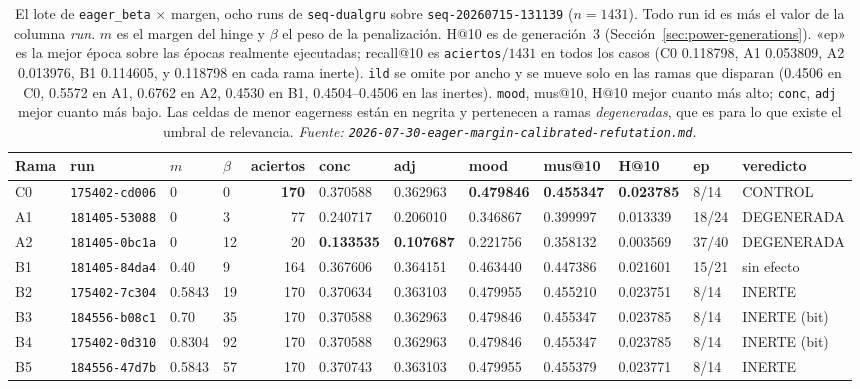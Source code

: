 \documentclass[11pt]{article}
\newcommand{\runid}[1]{\texttt{\small\seqsplit{#1}}}
\newcommand{\dsid}[1]{\texttt{\small #1}}
\newcommand{\best}[1]{\textbf{#1}}
\begin{document}
\begin{table}[ht]
  \centering
  \caption{El lote de \texttt{eager\_beta} $\times$ margen, ocho runs de
  \texttt{seq-dualgru} sobre \dsid{seq-20260715-131139} ($n=\num{1431}$). Todo run
  id es \protect\runid{run-20260730-} más el valor de la columna \emph{run}. $m$ es
  el margen del hinge y $\beta$ el peso de la penalización. H@10 es de
  generación~3 (Sección~\ref{sec:power-generations}). «ep» es la mejor época sobre
  las épocas realmente ejecutadas; recall@10 es \texttt{aciertos}$/\num{1431}$ en
  todos los casos (C0 \num{0.118798}, A1 \num{0.053809}, A2 \num{0.013976}, B1
  \num{0.114605}, y \num{0.118798} en cada rama inerte). \texttt{ild} se omite por
  ancho y se mueve solo en las ramas que disparan (\num{0.4506} en C0,
  \num{0.5572} en A1, \num{0.6762} en A2, \num{0.4530} en B1,
  \numrange{0.4504}{0.4506} en las inertes). \texttt{mood}, mus@10, H@10 mejor
  cuanto más alto; \texttt{conc}, \texttt{adj} mejor cuanto más bajo. Las celdas de
  menor eagerness están en negrita y pertenecen a ramas \emph{degeneradas}, que es
  para lo que existe el umbral de relevancia.
  \emph{Fuente: \texttt{2026-07-30-eager-margin-calibrated-refutation.md}.}}
  \label{tab:eagermargin}
  {\scriptsize\setlength{\tabcolsep}{2.5pt}\begin{tabular}{llllrlllllll}
    \toprule
    Rama & run & $m$ & $\beta$ & aciertos & conc & adj & mood & mus@10 & H@10 & ep & veredicto \\
    \midrule
    C0 & \texttt{175402-cd006} & 0 & 0 & \best{170} & 0.370588 & 0.362963 & \best{0.479846} & \best{0.455347} & \best{0.023785} & 8/14 & CONTROL \\
    A1 & \texttt{181405-53088} & 0 & 3 & 77 & 0.240717 & 0.206010 & 0.346867 & 0.399997 & 0.013339 & 18/24 & DEGENERADA \\
    A2 & \texttt{181405-0bc1a} & 0 & 12 & 20 & \best{0.133535} & \best{0.107687} & 0.221756 & 0.358132 & 0.003569 & 37/40 & DEGENERADA \\
    B1 & \texttt{181405-84da4} & 0.40 & 9 & 164 & 0.367606 & 0.364151 & 0.463440 & 0.447386 & 0.021601 & 15/21 & sin efecto \\
    B2 & \texttt{175402-7c304} & 0.5843 & 19 & 170 & 0.370634 & 0.363103 & 0.479955 & 0.455210 & 0.023751 & 8/14 & INERTE \\
    B3 & \texttt{184556-b08c1} & 0.70 & 35 & 170 & 0.370588 & 0.362963 & 0.479846 & 0.455347 & 0.023785 & 8/14 & INERTE (bit) \\
    B4 & \texttt{175402-0d310} & 0.8304 & 92 & 170 & 0.370588 & 0.362963 & 0.479846 & 0.455347 & 0.023785 & 8/14 & INERTE (bit) \\
    B5 & \texttt{184556-47d7b} & 0.5843 & 57 & 170 & 0.370743 & 0.363103 & 0.479955 & 0.455379 & 0.023771 & 8/14 & INERTE \\
    \bottomrule
  \end{tabular}}
\end{table}
\end{document}
